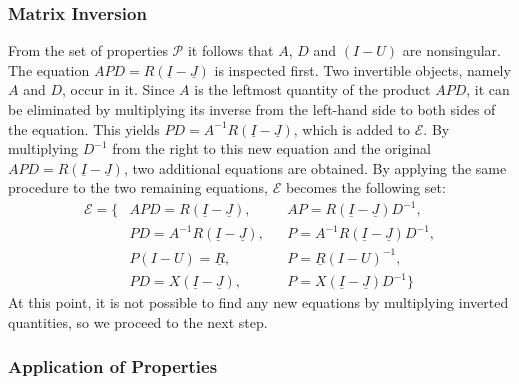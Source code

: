 \subsubsection{Matrix Inversion}

From the set of properties $\mathcal{P}$ it follows that $A$, $D$ and $(I - U)$ are nonsingular. The equation $APD = R \left( \underline{I} - \underline{J} \right)$ is inspected first. Two invertible objects, namely $A$ and $D$, occur in it. Since $A$ is the leftmost quantity of the product $APD$, it can be eliminated by multiplying its inverse from the left-hand side to both sides of the equation. This yields $PD = A^{-1} R \left( \underline{I} - \underline{J} \right)$, which is added to $\mathcal{E}$. By multiplying $D^{-1}$ from the right to this new equation and the original $APD = R \left( \underline{I} - \underline{J} \right)$, two additional equations are obtained. By applying the same procedure to the two remaining equations, $\mathcal{E}$ becomes the following set:
\begin{align*}
\mathcal{E} = \{ &APD = R \left( \underline{I} - \underline{J} \right), &&AP = R \left( \underline{I} - \underline{J} \right)D^{-1}, \\
	&PD = A^{-1}R \left( \underline{I} - \underline{J} \right), &&P = A^{-1} R \left( \underline{I} - \underline{J} \right) D^{-1}, \\
	&P \left( I - U \right) = \underline{R}, &&P = \underline{R} \left( I - U \right)^{-1}, \\
	&PD = X \left( \underline{I} - \underline{J} \right), &&P = X \left( \underline{I} - \underline{J} \right) D^{-1} \}
\end{align*}
%
At this point, it is not possible to find any new equations by multiplying inverted quantities, so we proceed to the next step.

\subsubsection{Application of Properties}

